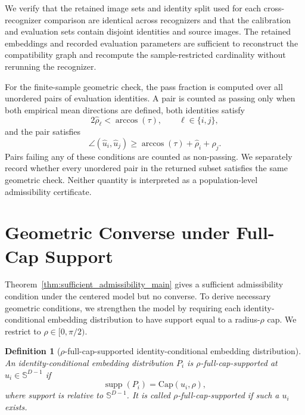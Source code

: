 \documentclass[journal]{IEEEtran}
\newtheorem{definition}[theorem]{Definition}
\begin{document}
\begin{bibunit}
We verify that the retained image sets and identity split used for each cross-recognizer comparison are identical across recognizers and that the calibration and evaluation sets contain disjoint identities and source images. The retained embeddings and recorded evaluation parameters are sufficient to reconstruct the compatibility graph and recompute the sample-restricted cardinality without rerunning the recognizer.

For the finite-sample geometric check, the pass fraction is computed over all unordered pairs of evaluation identities. A pair is counted as passing only when both empirical mean directions are defined, both identities satisfy
%
\begin{equation}
2\widehat\rho_\ell<\arccos(\tau), \qquad \ell\in\{i,j\},
\end{equation}
%
and the pair satisfies
%
\begin{equation}
\angle(\widehat u_i,\widehat u_j) \ge \arccos(\tau)+\widehat\rho_i+\widehat\rho_j.
\end{equation}
%
Pairs failing any of these conditions are counted as non-passing. We separately record whether every unordered pair in the returned subset satisfies the same geometric check. Neither quantity is interpreted as a population-level admissibility certificate.





\section{Geometric Converse under Full-Cap Support}
\label{sec:full_cap_converse}

Theorem~\ref{thm:sufficient_admissibility_main} gives a sufficient admissibility condition under the centered model but no converse. To derive necessary geometric conditions, we strengthen the model by requiring each identity-conditional embedding distribution to have support equal to a radius-$\rho$ cap. We restrict to $\rho\in[0,\pi/2)$.


\begin{definition}[$\rho$-full-cap-supported identity-conditional embedding distribution]
\label{def:full_cap_supported}
%
An identity-conditional embedding distribution $P_i$ is \textit{$\rho$-full-cap-supported at}
$u_i\in\mathbb S^{D-1}$ if
%
\begin{equation}
\operatorname{supp}(P_i) = \mathrm{Cap}(u_i,\rho),
\label{eq:full_cap_support_def}
\end{equation}
%
where support is relative to $\mathbb S^{D-1}$. It is called \textit{$\rho$-full-cap-supported} if such a $u_i$ exists.
%
\end{definition}


\end{bibunit}
\end{document}
